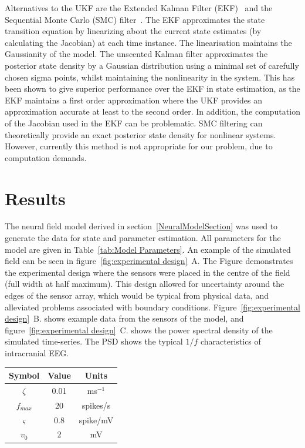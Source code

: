 \documentclass[12pt]{iopart}
\begin{document}
Alternatives to the UKF are the Extended Kalman Filter (EKF)~\cite{Haykin2001} and the Sequential Monte Carlo (SMC) filter~\cite{doucet2001}. The EKF approximates the state transition equation by linearizing about the current state estimates (by calculating the Jacobian) at each time instance. The linearisation maintains the Gaussianity of the model. The unscented Kalman filter approximates the posterior state density by a Gaussian distribution using a minimal set of carefully chosen sigma points, whilst maintaining the nonlinearity in the system. This has been shown to give superior performance over the EKF in state estimation, as the EKF maintains a first order approximation where the UKF provides an approximation accurate at least to the second order. In addition, the computation of the Jacobian used in the EKF can be problematic. SMC filtering can theoretically provide an exact posterior state density for nonlinear systems. However, currently this method is not appropriate for our problem, due to computation demands. 

\section{Results}\label{ResultsSection} The neural field model derived in section~\ref{NeuralModelSection} was used to generate the data for state and parameter estimation. All parameters for the model are given in Table~\ref{tab:Model Parameters}. An example of the simulated field can be seen in figure~\ref{fig:experimental design}~A. The Figure demonstrates the experimental design where the sensors were placed in the centre of the field (full width at half maximum). This design allowed for uncertainty around the edges of the sensor array, which would be typical from physical data, and alleviated problems associated with boundary conditions. Figure~\ref{fig:experimental design}~B. shows example data from the sensors of the model, and figure~\ref{fig:experimental design}~C. shows the power spectral density of the simulated time-series. The PSD shows the typical $1/f$ characteristics of intracranial EEG.

\begin{center}
\begin{tabular}{c|c|c}	
	\hline\hline Symbol & Value & Units \\
	\hline\hline
	$\zeta$ & 0.01 & ms$^{-1}$\\
	$f_{max}$ & 20 & spikes/s \\
	$\varsigma$ & 0.8 & spike/mV\\
	$v_0$ & 2 & mV\\
	\hline\hline
\end{tabular}\label{tab:Model Parameters}
\end{center}
\end{document}

